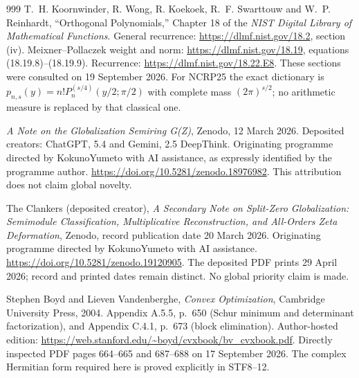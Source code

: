 \documentclass[11pt,a4paper]{article}
\begin{document}
\begin{thebibliography}{999}
T.~H. Koornwinder, R. Wong, R. Koekoek, R.~F. Swarttouw and
W.~P. Reinhardt, ``Orthogonal Polynomials,'' Chapter 18 of the
\emph{NIST Digital Library of Mathematical Functions}.
General recurrence: \url{https://dlmf.nist.gov/18.2}, section (iv).
Meixner--Pollaczek weight and norm:
\url{https://dlmf.nist.gov/18.19}, equations (18.19.8)--(18.19.9).
Recurrence: \url{https://dlmf.nist.gov/18.22.E8}.
These sections were consulted on 19 September 2026.
For NCRP25 the exact dictionary is
$p_{n,s}(y)=n!P_n^{(s/4)}(y/2;\pi/2)$ with complete mass
$(2\pi)^{s/2}$; no arithmetic measure is replaced by that classical one.

\emph{A Note on the Globalization Semiring G(Z)}, Zenodo,
12 March 2026. Deposited creators: ChatGPT, 5.4 and Gemini, 2.5 DeepThink.
Originating programme directed by KokunoYumeto with AI assistance,
as expressly identified by the programme author.
\url{https://doi.org/10.5281/zenodo.18976982}.
This attribution does not claim global novelty.

The Clankers (deposited creator), \emph{A Secondary Note on Split-Zero
Globalization: Semimodule Classification, Multiplicative Reconstruction,
and All-Orders Zeta Deformation}, Zenodo, record publication date
20 March 2026. Originating programme directed by KokunoYumeto
with AI assistance. \url{https://doi.org/10.5281/zenodo.19120905}.
The deposited PDF prints 29 April 2026; record and printed dates
remain distinct. No global priority claim is made.

Stephen Boyd and Lieven Vandenberghe,
\emph{Convex Optimization}, Cambridge University Press, 2004.
Appendix A.5.5, p.~650 (Schur minimum and determinant factorization),
and Appendix C.4.1, p.~673 (block elimination).
Author-hosted edition: \url{https://web.stanford.edu/~boyd/cvxbook/bv_cvxbook.pdf}.
Directly inspected PDF pages 664--665 and 687--688 on 17 September 2026.
The complex Hermitian form required here is proved explicitly in STF8--12.




\end{thebibliography}
\end{document}
